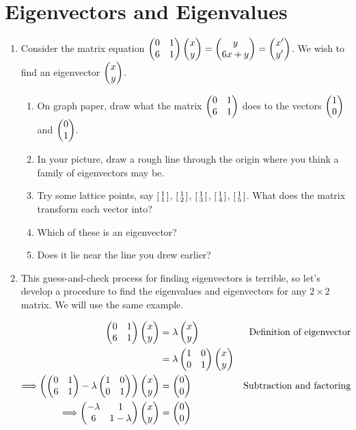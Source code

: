 \documentclass[../gatm_answers.tex]{subfiles}
\begin{document}
\section{Eigenvectors and Eigenvalues}

\begin{enumerate}
\item Consider the matrix equation $\begin{pmatrix} 0 & 1 \\ 6 & 1 \end{pmatrix}\begin{pmatrix} x \\ y \end{pmatrix} = \begin{pmatrix} y \\ 6x+y \end{pmatrix}=\begin{pmatrix} x' \\ y' \end{pmatrix}$. We wish to find an eigenvector $\begin{pmatrix} x \\ y \end{pmatrix}$.
\begin{enumerate}
\item On graph paper, draw what the matrix $\begin{pmatrix} 0 & 1 \\ 6 & 1 \end{pmatrix}$ does to the vectors $\begin{pmatrix} 1 \\ 0 \end{pmatrix}$ and $\begin{pmatrix} 0 \\ 1 \end{pmatrix}$.
\item In your picture, draw a rough line through the origin where you think a family of eigenvectors may be.
\item Try some lattice points, say $\left[\begin{smallmatrix} 1 \\ 1 \end{smallmatrix}\right]$, $\left[\begin{smallmatrix} 1 \\ 2 \end{smallmatrix}\right]$, $\left[\begin{smallmatrix} 1 \\ 3 \end{smallmatrix}\right]$, $\left[\begin{smallmatrix} 1 \\ 4 \end{smallmatrix}\right]$, $\left[\begin{smallmatrix} 1 \\ 5 \end{smallmatrix}\right]$. What does the matrix transform each vector into?
\item Which of these is an eigenvector?
\item Does it lie near the line you drew earlier?
\end{enumerate}
\item This guess-and-check process for finding eigenvectors is terrible, so let's develop a procedure to find the eigenvalues and eigenvectors for any $2\times 2$ matrix. We will use the same example.

\begin{align*}
\begin{pmatrix} 0 & 1 \\ 6 & 1 \end{pmatrix}\begin{pmatrix} x \\ y \end{pmatrix} &= \lambda\begin{pmatrix} x \\ y \end{pmatrix} & \text{Definition of eigenvector} \\
&= \lambda\begin{pmatrix} 1 & 0 \\ 0 & 1 \end{pmatrix}\begin{pmatrix} x \\ y \end{pmatrix} \\
\Longrightarrow \left(\begin{pmatrix} 0 & 1 \\ 6 & 1 \end{pmatrix}-\lambda\begin{pmatrix} 1 & 0 \\ 0 & 1 \end{pmatrix}\right)\begin{pmatrix} x \\ y \end{pmatrix}&=\begin{pmatrix} 0 \\ 0 \end{pmatrix} & \text{Subtraction and factoring} \\
\Longrightarrow \begin{pmatrix} -\lambda & 1 \\ 6 & 1-\lambda \end{pmatrix}\begin{pmatrix} x \\ y \end{pmatrix} &= \begin{pmatrix} 0 \\ 0 \end{pmatrix}
\end{align*}


\end{enumerate}
\end{document}
